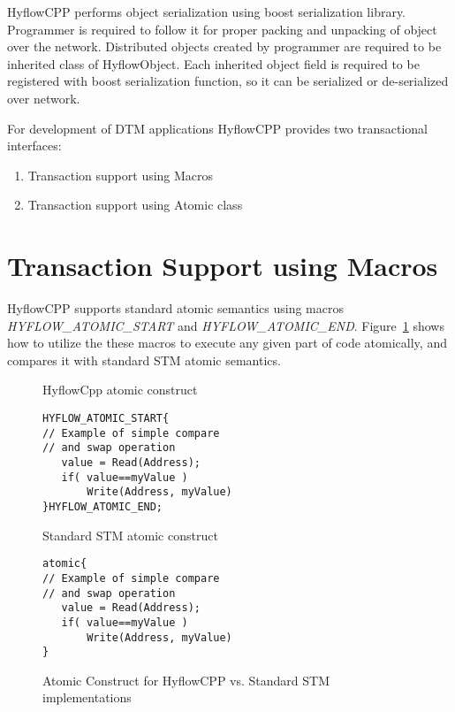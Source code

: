 \documentclass[12pt,english]{report}
\begin{document}
HyflowCPP performs object serialization using boost serialization library. Programmer is required to follow it for proper packing and unpacking of object over the network. Distributed objects created by programmer are required to be inherited class of HyflowObject. Each inherited object field is required to be registered with boost serialization function, so it can be serialized or de-serialized over network.

For development of DTM applications HyflowCPP provides two transactional interfaces: 
\begin{enumerate}
\item Transaction support using Macros
\item Transaction support using Atomic class 
\end{enumerate}

\section{Transaction Support using Macros}

HyflowCPP supports standard atomic semantics using macros \emph{HYFLOW{\_}ATOMIC{\_}START} and \emph{HYFLOW{\_}ATOMIC{\_}END}. Figure~\ref{Fig:atomicConstr} shows how to utilize the these macros to execute any given part of code atomically, and compares it with standard STM atomic semantics. 

\begin{figure}
\centering 
\begin{footnotesize}
\begin{minipage}[b]{0.45\linewidth}\centering
HyflowCpp atomic construct 
\begin{lstlisting}
HYFLOW_ATOMIC_START{
// Example of simple compare
// and swap operation
   value = Read(Address);
   if( value==myValue )
       Write(Address, myValue)
}HYFLOW_ATOMIC_END;
\end{lstlisting} 
\end{minipage} 
\begin{minipage}[b]{0.45\linewidth}\centering
Standard STM atomic construct
\begin{lstlisting}   					   
atomic{
// Example of simple compare
// and swap operation
   value = Read(Address);
   if( value==myValue )
       Write(Address, myValue)
}
\end{lstlisting}			  
\end{minipage}
\end{footnotesize}
\label{Fig:atomicConstr}\caption{Atomic Construct for HyflowCPP vs. Standard STM implementations}
\end{figure}
\end{document}
